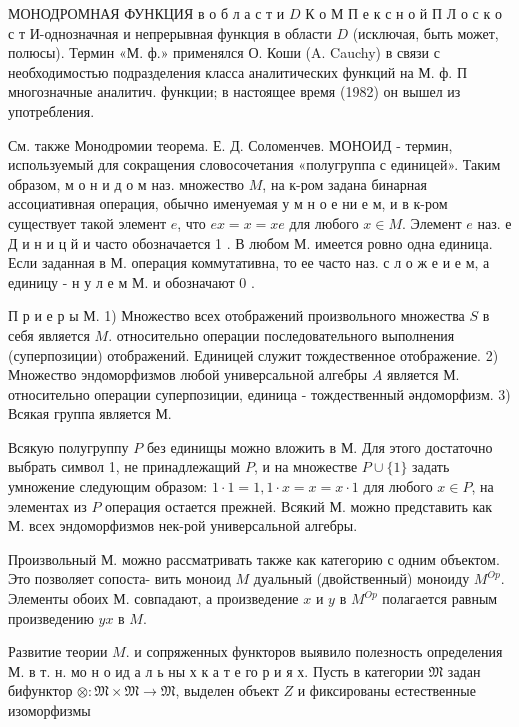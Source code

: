 \documentclass[10pt]{article}
\begin{document}
МОНОДРОМНАЯ ФУНКЦИЯ в о б л а с т и $D$ К о М П е к с н о й П Л о с к о с т И-однозначная и непрерывная функция в области $D$ (исключая, быть может, полюсы). Термин «М. ф.» применялся О. Коши (A. Cauchy) в связи с необходимостью подразделения класса аналитических функций на М. ф. П многозначные аналитич. функции; в настоящее время (1982) он вышел из употребления.



См. также Монодромии теорема. Е. Д. Соломенчев. МОНОИД - термин, используемый для сокращения словосочетания «полугруппа с единицей». Таким образом, м о н и д о м наз. множество $M$, на к-ром задана бинарная ассоциативная операция, обычно именуемая у м н о е ни е м, и в к-ром существует такой элемент $e$, что $e x=x=x e$ для любого $x \in M$. Элемент $e$ наз. е Д и н и ц й и часто обозначается 1 . В любом М. имеется ровно одна единица. Если заданная в М. операция коммутативна, то ее часто наз. с л о ж е и е м, а единицу - н у л е м М. и обозначают 0 .



П р и е р ы М. 1) Множество всех отображений произвольного множества $S$ в себя является $M$. относительно операции последовательного выполнения (суперпозиции) отображений. Единицей служит тождественное отображение. 2) Множество эндоморфизмов любой универсальной алгебры $A$ является М. относительно операции суперпозиции, единица - тождественный әндоморфизм. 3) Всякая группа является М.



Всякую полугруппу $P$ без единищы можно вложить в М. Для этого достаточно выбрать символ 1, не принадлежащий $P$, и на множестве $P \cup\{1\}$ задать умножение следующим образом: $1 \cdot 1=1,1 \cdot x=x=x \cdot 1$ для любого $x \in P$, на элементах из $P$ операция остается прежней. Всякий М. можно представить как М. всех эндоморфизмов нек-рой универсальной алгебры.



Произвольный М. можно рассматривать также как категорию с одним объектом. Это позволяет сопоста- вить моноид $M$ дуальный (двойственный) моноиду $M^{O p}$. Элементы обоих М. совпадают, а произведение $x$ и $y$ в $M^{O p}$ полагается равным произведению $y x$ в $M$.



Развитие теории $M$. и сопряженных функторов выявило полезность определения М. в т. н. мо н о ид а л ь ны х к а т е го р и я х. Пусть в категории $\mathfrak{M}$ задан бифунктор $\otimes: \mathfrak{M} \times \mathfrak{M} \rightarrow \mathfrak{M}$, выделен объект $Z$ и фиксированы естественные изоморфизмы
\end{document}
